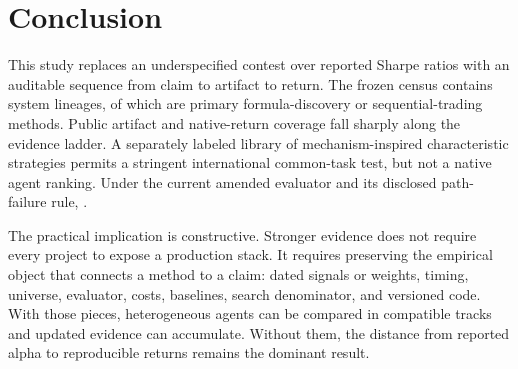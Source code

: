 \documentclass[11pt]{article}
\begin{document}
\section{Conclusion}\label{sec:conclusion}

This study replaces an underspecified contest over reported Sharpe ratios with an auditable sequence from claim to artifact to return. The frozen census contains \SystemCount{} system lineages, of which \MethodSystemCount{} are primary formula-discovery or sequential-trading methods. Public artifact and native-return coverage fall sharply along the evidence ladder. A separately labeled library of \ProxyCount{} mechanism-inspired characteristic strategies permits a stringent international common-task test, but not a native agent ranking. Under the current amended evaluator and its disclosed path-failure rule, \ConclusionResult{}.

The practical implication is constructive. Stronger evidence does not require every project to expose a production stack. It requires preserving the empirical object that connects a method to a claim: dated signals or weights, timing, universe, evaluator, costs, baselines, search denominator, and versioned code. With those pieces, heterogeneous agents can be compared in compatible tracks and updated evidence can accumulate. Without them, the distance from reported alpha to reproducible returns remains the dominant result.
\end{document}
